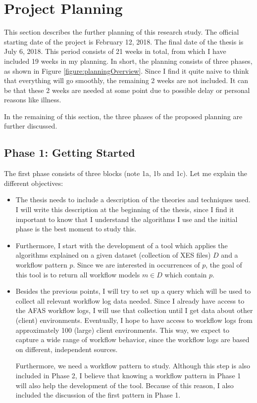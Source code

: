 \documentclass[a4paper,11pt]{article}
\begin{document}
\section{Project Planning}
\label{section:planning}
This section describes the further planning of this research study. The official starting date of the project is February 12, 2018. The final date of the thesis is July 6, 2018. This period consists of 21 weeks in total, from which I have included 19 weeks in my planning. In short, the planning consists of three phases, as shown in Figure \ref{figure:planningOverview}. Since I find it quite naive to think that everything will go smoothly, the remaining 2 weeks are not included. It can be that these 2 weeks are needed at some point due to possible delay or personal reasons like illness.

In the remaining of this section, the three phases of the proposed planning are further discussed.

\subsection{Phase 1: Getting Started}
The first phase consists of three blocks (note 1a, 1b and 1c). Let me explain the different objectives:
\begin{itemize}
\item The thesis needs to include a description of the theories and techniques used. I will write this description at the beginning of the thesis, since I find it important to know that I understand the algorithms I use and the initial phase is the best moment to study this.
\item Furthermore, I start with the development of a tool which applies the algorithms explained on a given dataset (collection of XES files) $D$ and a workflow pattern $p$. Since we are interested in occurrences of $p$, the goal of this tool is to return all workflow models $m \in D$ which contain $p$.
\item Besides the previous points, I will try to set up a query which will be used to collect all relevant workflow log data needed. Since I already have access to the AFAS workflow logs, I will use that collection until I get data about other (client) environments. Eventually, I hope to have access to workflow logs from approximately 100 (large) client environments. This way, we expect to capture a wide range of workflow behavior, since the workflow logs are based on different, independent sources.

Furthermore, we need a workflow pattern to study. Although this step is also included in Phase 2, I believe that knowing a workflow pattern in Phase 1 will also help the development of the tool. Because of this reason, I also included the discussion of the first pattern in Phase 1.
\end{itemize}
\end{document}
